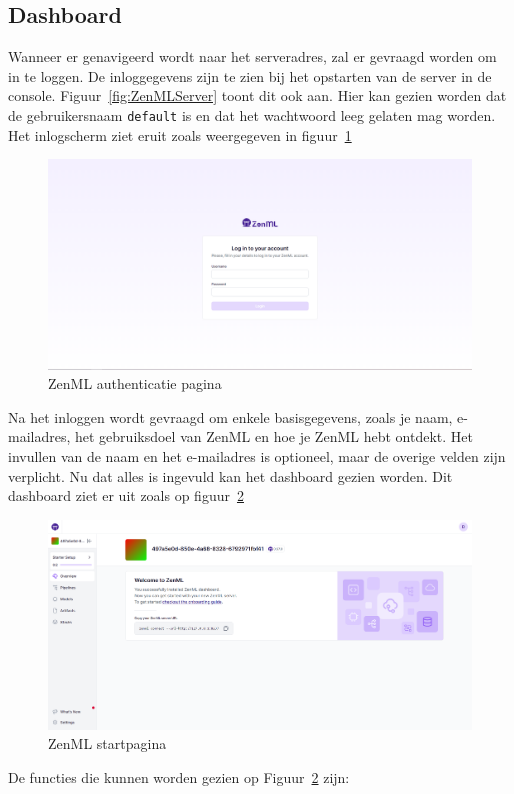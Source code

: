 \subsection{Dashboard}
Wanneer er genavigeerd wordt naar het serveradres, zal er gevraagd worden om in te loggen. De inloggegevens zijn te zien bij het opstarten van de server in de console. Figuur~\ref{fig:ZenMLServer} toont dit ook aan. Hier kan gezien worden dat de gebruikersnaam \texttt{default} is en dat het wachtwoord leeg gelaten mag worden. Het inlogscherm ziet eruit zoals weergegeven in figuur~\ref{fig:ZenML_Login}
\begin{figure}
    \centering
    \includegraphics[width=0.9\linewidth]{graphics/ZenML_Login.PNG}
    \caption{ZenML authenticatie pagina}
    \label{fig:ZenML_Login}
\end{figure}
Na het inloggen wordt gevraagd om enkele basisgegevens, zoals je naam, e-mailadres, het gebruiksdoel van ZenML en hoe je ZenML hebt ontdekt. Het invullen van de naam en het e-mailadres is optioneel, maar de overige velden zijn verplicht.
Nu dat alles is ingevuld kan het dashboard gezien worden. Dit dashboard ziet er uit zoals op figuur~\ref{fig:ZenML_Overview}
\begin{figure}
    \centering
    \includegraphics[width=0.9\linewidth]{graphics/ZenML_Overview.PNG}
    \caption{ZenML startpagina}
    \label{fig:ZenML_Overview}
\end{figure}
De functies die kunnen worden gezien op Figuur~\ref{fig:ZenML_Overview} zijn:

